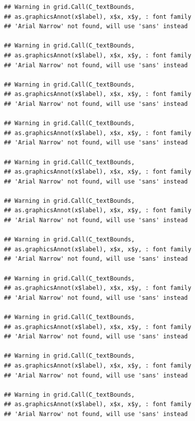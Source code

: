\documentclass[]{krantz}
\begin{document}
\begin{verbatim}
## Warning in grid.Call(C_textBounds,
## as.graphicsAnnot(x$label), x$x, x$y, : font family
## 'Arial Narrow' not found, will use 'sans' instead

## Warning in grid.Call(C_textBounds,
## as.graphicsAnnot(x$label), x$x, x$y, : font family
## 'Arial Narrow' not found, will use 'sans' instead

## Warning in grid.Call(C_textBounds,
## as.graphicsAnnot(x$label), x$x, x$y, : font family
## 'Arial Narrow' not found, will use 'sans' instead

## Warning in grid.Call(C_textBounds,
## as.graphicsAnnot(x$label), x$x, x$y, : font family
## 'Arial Narrow' not found, will use 'sans' instead

## Warning in grid.Call(C_textBounds,
## as.graphicsAnnot(x$label), x$x, x$y, : font family
## 'Arial Narrow' not found, will use 'sans' instead

## Warning in grid.Call(C_textBounds,
## as.graphicsAnnot(x$label), x$x, x$y, : font family
## 'Arial Narrow' not found, will use 'sans' instead

## Warning in grid.Call(C_textBounds,
## as.graphicsAnnot(x$label), x$x, x$y, : font family
## 'Arial Narrow' not found, will use 'sans' instead

## Warning in grid.Call(C_textBounds,
## as.graphicsAnnot(x$label), x$x, x$y, : font family
## 'Arial Narrow' not found, will use 'sans' instead

## Warning in grid.Call(C_textBounds,
## as.graphicsAnnot(x$label), x$x, x$y, : font family
## 'Arial Narrow' not found, will use 'sans' instead

## Warning in grid.Call(C_textBounds,
## as.graphicsAnnot(x$label), x$x, x$y, : font family
## 'Arial Narrow' not found, will use 'sans' instead

## Warning in grid.Call(C_textBounds,
## as.graphicsAnnot(x$label), x$x, x$y, : font family
## 'Arial Narrow' not found, will use 'sans' instead
\end{verbatim}
\end{document}
